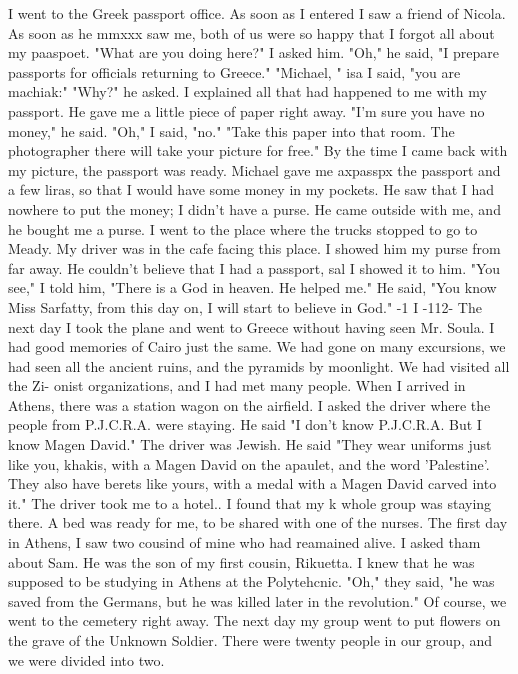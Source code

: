 I went to the 
Greek passport office.
As soon as I entered I saw a friend of Nicola.
As soon as he mmxxx 
saw me, both of us were so happy that I forgot all about my paaspoet.
"What are you doing here?"
I asked him.
"Oh," he said, "I prepare passports for officials returning to Greece."
"Michael, " isa I said, "you are machiak:" 
"Why?"
he asked.
I explained all that had happened to me with my passport.
He 
gave me a little piece of paper right away.
"I'm sure you have no money," he said.
"Oh," I said, "no."
"Take this paper into that room.
The photographer there will take your picture 
for free."
By the time I came back with my picture, the passport was ready.
Michael 
gave me axpasspx the passport and a few liras, so that I would have some money in my 
pockets.
He saw that I had nowhere to put the money; I didn't have a purse.
He came 
outside with me, and he bought me a purse.
I went to the place where the trucks stopped to go to Meady.
My driver was in the 
cafe facing this place.
I showed him my purse from far away.
He couldn't believe that 
I had a passport, sal I showed it to him.
"You see," I told him, "There is a God in 
heaven.
He helped me."
He said, "You know Miss Sarfatty, from this day on, I will 
start to believe in God."
-1 I 
-112- 
The next day I took the plane and went to Greece without having seen Mr.
Soula.
I had good memories of Cairo just the same.
We had gone on many excursions, we had 
seen all the ancient ruins, and the pyramids by moonlight.
We had visited all the Zi-
onist organizations, and I had met many people.
When I arrived in Athens, there was a station wagon on the airfield.
I asked the 
driver where the people from P.J.C.R.A.
were staying.
He said "I don't know P.J.C.R.A.
But I know Magen David."
The driver was Jewish.
He said "They wear uniforms just like 
you, khakis, with a Magen David on the apaulet, and the word 'Palestine'.
They also 
have berets like yours, with a medal with a Magen David carved into it."
The driver 
took me to a hotel.. I found that my k whole group was staying there.
A bed was ready 
for me, to be shared with one of the nurses.
The first day in Athens, I saw two cousind of mine who had reamained alive.
I 
asked tham about Sam.
He was the son of my first cousin, Rikuetta.
I knew that he 
was supposed to be studying in Athens at the Polytehcnic.
"Oh," they said, "he was 
saved from the Germans, but he was killed later in the revolution."
Of course, we 
went to the cemetery right away.
The next day my group went to put flowers on the grave of the Unknown Soldier.
There were twenty people in our group, and we were divided into two.
